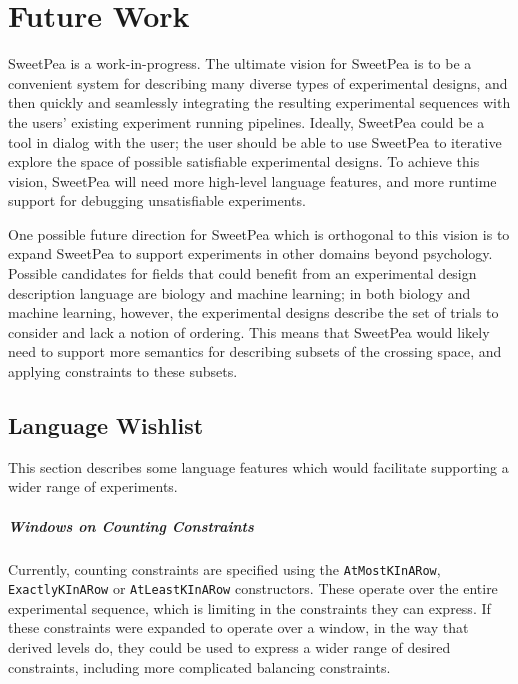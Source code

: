 \chapter{Future Work}

SweetPea is a work-in-progress. The ultimate vision for SweetPea is to be a convenient system for describing many diverse types of experimental designs, and then quickly and seamlessly integrating the resulting experimental sequences with the users' existing experiment running pipelines. Ideally, SweetPea could be a tool in dialog with the user; the user should be able to use SweetPea to iterative explore the space of possible satisfiable experimental designs. To achieve this vision, SweetPea will need more high-level language features, and more runtime support for debugging unsatisfiable experiments.

One possible future direction for SweetPea which is orthogonal to this vision is to expand SweetPea to support experiments in other domains beyond psychology. Possible candidates for fields that could benefit from an experimental design description language are biology and machine learning; in both biology and machine learning, however, the experimental designs describe the set of trials to consider and lack a notion of ordering. This means that SweetPea would likely need to support more semantics for describing subsets of the crossing space, and applying constraints to these subsets.

\section{Language Wishlist}

This section describes some language features which would facilitate supporting a wider range of experiments.

\paragraph*{Windows on Counting Constraints}
Currently, counting constraints are specified using the \texttt{AtMostKInARow}, \texttt{ExactlyKInARow} or \texttt{AtLeastKInARow} constructors. These operate over the entire experimental sequence, which is limiting in the constraints they can express. If these constraints were expanded to operate over a window, in the way that derived levels do, they could be used to express a wider range of desired constraints, including more complicated balancing constraints.

